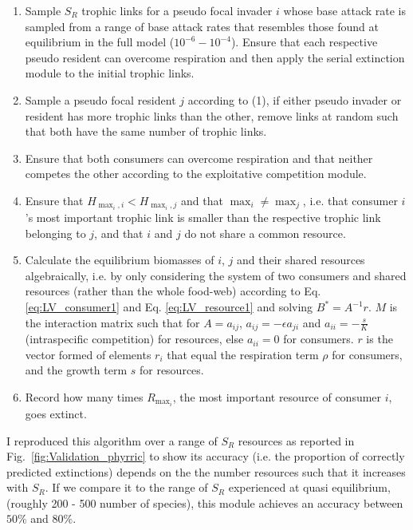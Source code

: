 \documentclass[a4paper]{report}
\DeclareMathOperator{\max}{max}
\begin{document}
\begin{enumerate}

\item Sample $S_R$ trophic links for a pseudo focal invader $i$ whose base attack rate is sampled from a range of base attack rates that resembles those found at equilibrium in the full model ($10^{-6}-10^{-4}$). Ensure that each respective pseudo resident can overcome respiration and then apply the serial extinction module to the initial trophic links. 

\item Sample a pseudo focal resident $j$ according to (1), if either pseudo invader or resident has more trophic links than the other, remove links at random such that both have the same number of trophic links. 

\item Ensure that both consumers can overcome respiration and that neither competes the other according to the exploitative competition module.

\item Ensure that $H_{\max_i,i}<H_{\max_i,j}$ and that $\max_i \neq \max_j$, i.e. that consumer $i$'s most important trophic link is smaller than the respective trophic link belonging to $j$, and that $i$ and $j$ do not share a common resource.

\item Calculate the equilibrium biomasses of $i$, $j$ and their shared resources algebraically, i.e. by only considering the system of two consumers and shared resources (rather than the whole food-web) according to Eq. \eqref{eq:LV_consumer1} and Eq. \eqref{eq:LV_resource1} and solving $B^*=A^{-1} r$. $M$ is the interaction matrix such that for $A={a_{ij}}$, $a_{ij}= - \epsilon a_{ji}$ and $a_{ii}=-\frac{s}{K}$   (intraspecific competition) for resources, else $a_{ii}=0$ for consumers. $r$ is the vector formed of elements $r_i$ that equal the respiration term $\rho$ for consumers, and the growth term $s$ for resources.

\item Record how many times $R_{\max_i}$, the most important resource of consumer $i$, goes extinct.

\end{enumerate}

I reproduced this algorithm over a range of $S_R$ resources as reported in Fig.~\ref{fig:Validation_phyrric} to show its accuracy (i.e. the proportion of correctly predicted extinctions) depends on the the number resources such that it increases with $S_R$. If we compare it to the range of $S_R$ experienced at quasi equilibrium, (roughly 200 - 500 number of species), this module achieves an accuracy between $50\%$ and $80\%$.
\end{document}
